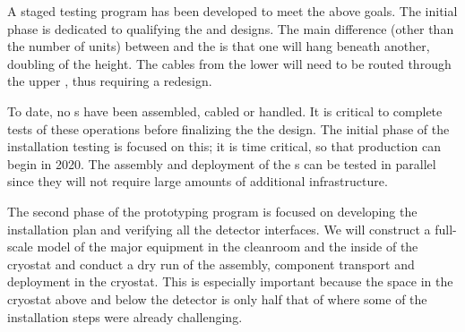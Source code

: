 
A staged testing program has been developed to meet the above goals.  The initial phase is dedicated to qualifying the  and  designs. The main difference (other than the number of units) between  and the   is that one  will hang beneath another, doubling of the height. The cables from the lower  will need to be routed through the upper , thus requiring a redesign. 

To date, no s have been assembled, cabled or handled. It is critical to complete tests of these operations before finalizing the  the  design. The initial phase of the installation testing is focused on this; it is time critical, so that  production can begin in 2020. The assembly and deployment of the s can  be tested in parallel since they will not require large amounts of additional infrastructure.

The second phase of the prototyping program is focused on developing the installation plan and verifying all the detector interfaces. %
We will construct a full-scale model of the major equipment in the cleanroom and the inside of the cryostat and conduct  %
a dry run of the assembly, component transport and deployment in the cryostat. %
This is especially important because the space in the  cryostat above and below the detector is only half that of  where some of the installation steps were already challenging.

